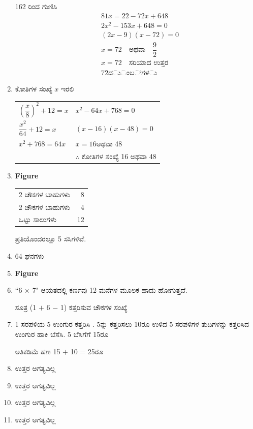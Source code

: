 \begin{enumerate}
162 ರಿಂದ ಗುಣಿಸಿ 
\begin{align*}
& 81x = 22 - 72x + 648\\
& 2x^{2} - 153x + 648 = 0\\
& (2x - 9) (x - 72) = 0\\
& x = 72 \quad\text{ಅಥವಾ}\quad \dfrac{9}{2}\\
& x = 72 \quad\text{ಸರಿಯಾದ ಉತ್ತರ}\\
& 72 ದುಂಬಿಗಳು 
\end{align*}

\item ಕೋತಿಗಳ ಸಂಖ್ಯೆ  $x$ ಇರಲಿ 

\begin{tabular}{l|l}
$\left(\dfrac{x}{8}\right)^{2} + 12 = x$ & $x^{2} - 64x + 768 = 0$\\
$\dfrac{x^{2}}{64} + 12 = x$ & $(x - 16) (x - 48) = 0$\\
$x^{2} + 768 = 64x$ & $x = 16$\quad ಅಥವಾ 48\\
& $\therefore$ ಕೋತಿಗಳ ಸಂಖ್ಯೆ 16 ಅಥವಾ 48
\end{tabular}

\smallskip
\item 
\begin{center}
{\bf Figure}
\end{center}

\begin{tabular}{lr}
2 ಚೌಕಗಳ ಬಾಹುಗಳು & 8\\
2 ಚೌಕಗಳ ಬಾಹುಗಳು & 4\\
\hline
ಒಟ್ಟು ಸಾಲುಗಳು & 12\\
\hline
\end{tabular}

ಪ್ರತಿಯೊಂದರಲ್ಲೂ 5 ಸಸಿಗಳಿವೆ.

\item 64 ಘನಗಳು 

\item 
\begin{center}
{\bf Figure}
\end{center}

\item “6 $\times$ 7" ಆಯತದಲ್ಲಿ ಕರ್ಣವು 12 ಮನೆಗಳ ಮೂಲಕ ಹಾದು ಹೋಗುತ್ತದೆ.

ಸೂತ್ರ (1 $+$ 6 $-$ 1) ಕತ್ತರಿಸುವ ಚೌಕಗಳ ಸಂಖ್ಯೆ 

\item 1 ಸರಪಳಿಯ 5 ಉಂಗುರ ಕತ್ತರಿಸಿ . 5ನ್ನು ಕತ್ತರಿಸಲು 10ರೂ ಉಳಿದ 5 ಸರಪಳಿಗಳ ತುದಿಗಳನ್ನು ಕತ್ತರಿಸಿದ ಉಂಗುರ ಹಾಕಿ ಬೆಸೆಸಿ. 5 ಬೆಸಿಗೆಗೆ 15ರೂ 

ಅತಿಕಡಿಮೆ ಹಣ 15 $+$ 10 = 25ರೂ 

\item ಉತ್ತರ ಅಗತ್ಯವಿಲ್ಲ 

\item ಉತ್ತರ ಅಗತ್ಯವಿಲ್ಲ 

\item ಉತ್ತರ ಅಗತ್ಯವಿಲ್ಲ 

\item ಉತ್ತರ ಅಗತ್ಯವಿಲ್ಲ 
\end{enumerate}

